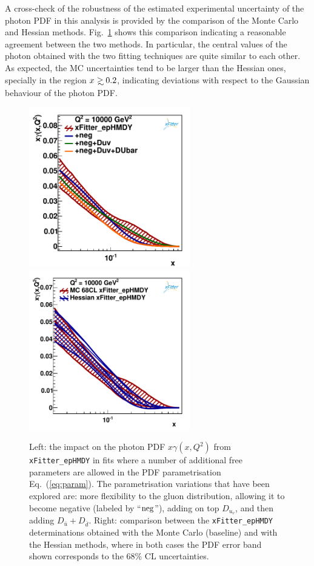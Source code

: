 A cross-check of the robustness of the estimated
experimental uncertainty of the photon PDF in this analysis is provided by the
comparison of the Monte Carlo and Hessian methods.
%
Fig.~\ref{fig:photon_mc_vs_hessian} shows this comparison
indicating a reasonable agreement between the two methods.
%
In particular, the central values of the photon obtained with the two
fitting techniques are quite similar to each other.
%
As expected, the MC uncertainties tend to be larger than the Hessian ones,
specially in the region $x\gsim 0.2$, indicating deviations with respect
to the Gaussian behaviour of the photon PDF.

\begin{figure}[t]
\centering
\includegraphics[width=7cm]{figs/q2_10000_pdf_ph_param_var.pdf}
\includegraphics[width=7cm]{figs/photon_mc_vs_hessian} 
\caption{Left: the impact on the photon PDF $x\gamma(x,Q^2)$
  from {\tt xFitter\_epHMDY}
  in fits where a number of additional free parameters are allowed
  in the PDF parametrisation Eq.~(\ref{eq:param}).
  The parametrisation variations that have been explored
  are: more flexibility to the gluon distribution, allowing
  it to become negative
  (labeled by ``${\rm neg}$''), adding on top $D_{u_v}$, and then
  adding $D_{\bar{u}}+D_{\bar{d}}$.
 Right: comparison between the {\tt xFitter\_epHMDY} determinations obtained with the
 Monte Carlo (baseline) and with the Hessian methods, where in
  both cases the PDF error band  shown corresponds to the 68\% CL uncertainties.  }
\label{fig:param}
\label{fig:photon_mc_vs_hessian}
\end{figure}

